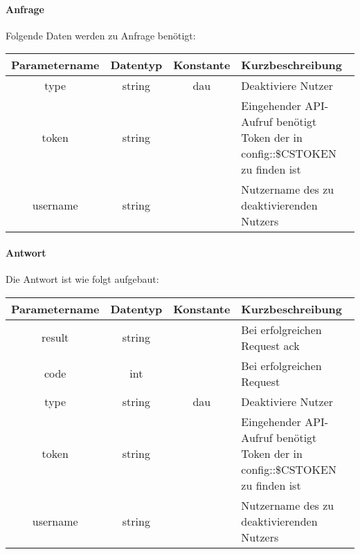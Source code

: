 \paragraph{Anfrage}Folgende Daten werden zu Anfrage benötigt:
\begin{table}[H]
	\begin{tabular}{|c|c|c|p{6.5cm}|}
		\hline
		\textbf{Parametername} & \textbf{Datentyp} & \textbf{Konstante} & \textbf{Kurzbeschreibung}                                                                                               \\ \hline
		type                & string            & dau                & Deaktiviere Nutzer                                                                                                      \\ \hline
		token               & string            &                    & Eingehender API-Aufruf benötigt Token der in config::\$CSTOKEN zu finden ist \\ \hline
		username            & string            &                    & Nutzername des zu deaktivierenden Nutzers                                                                               \\ \hline
	\end{tabular}
\end{table}
\paragraph{Antwort}Die Antwort ist wie folgt aufgebaut:
\begin{table}[H]
	\begin{tabular}{|c|c|c|p{6.5cm}|}
		\hline
		\textbf{Parametername} & \textbf{Datentyp} & \textbf{Konstante} & \textbf{Kurzbeschreibung}                                                                                               \\ \hline
		result              & string            &                    & Bei erfolgreichen Request {\glqq ack\grqq}                                                                            \\ \hline
		code                & int               &                    & Bei erfolgreichen Request {\glqq 0\grqq} \\ \hline
		type                & string            & dau                & Deaktiviere Nutzer                                                                                                      \\ \hline
		token               & string            &                    & Eingehender API-Aufruf benötigt Token der in config::\$CSTOKEN zu finden ist \\ \hline
		username            & string            &                    & Nutzername des zu deaktivierenden Nutzers                                                                               \\ \hline
	\end{tabular}
\end{table}
